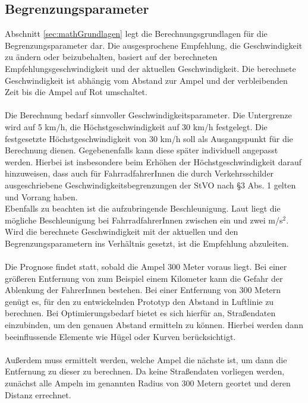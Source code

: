 \subsection{Begrenzungsparameter}
Abschnitt \ref{sec:mathGrundlagen} legt die Berechnungsgrundlagen für die Begrenzungsparameter dar. Die ausgesprochene Empfehlung, die Geschwindigkeit zu ändern oder beizubehalten, basiert auf der berechneten Empfehlungsgeschwindigkeit und der aktuellen Geschwindigkeit. Die berechnete Geschwindigkeit ist abhängig vom Abstand zur Ampel und der verbleibenden Zeit bis die Ampel auf Rot umschaltet.\\\\
Die Berechnung bedarf sinnvoller Geschwindigkeitsparameter. Die Untergrenze wird auf 5 km/h, die Höchstgeschwindigkeit auf 30 km/h festgelegt. Die festgesetzte Höchstgeschwindigkeit von 30 km/h soll als Ausgangspunkt für die Berechnung dienen. Gegebenenfalls kann diese später individuell angepasst werden. 
Hierbei ist insbesondere beim Erhöhen der Höchstgeschwindigkeit darauf hinzuweisen, dass auch für FahrradfahrerInnen die durch Verkehrsschilder ausgeschriebene Geschwindigkeitsbegrenzungen der StVO nach \S 3 Abs. 1 gelten und Vorrang haben. \\
Ebenfalls zu beachten ist die aufzubringende Beschleunigung. Laut \cite{beschleunigung} liegt die mögliche Beschleunigung bei FahrradfahrerInnen zwischen ein und zwei m/s$^{2}$. Wird die berechnete Geschwindigkeit mit der aktuellen und den Begrenzungsparametern ins Verhältnis gesetzt, ist die Empfehlung abzuleiten.\\\\ 
Die Prognose findet statt, sobald die Ampel 300 Meter voraus liegt. Bei einer größeren Entfernung von zum Beispiel einem Kilometer kann die Gefahr der Ablenkung der FahrerInnen bestehen. Bei einer Entfernung von 300 Metern genügt es, für den zu entwickelnden Prototyp den Abstand in Luftlinie zu berechnen. Bei Optimierungsbedarf bietet es sich hierfür an, Straßendaten einzubinden, um den genauen Abstand ermitteln zu können. Hierbei werden dann beeinflussende Elemente wie Hügel oder Kurven berücksichtigt.\\\\
Außerdem muss ermittelt werden, welche Ampel die nächste ist, um dann die Entfernung zu dieser zu berechnen. Da keine Straßendaten vorliegen werden, zunächst alle Ampeln im genannten Radius von 300 Metern geortet und deren Distanz errechnet.
